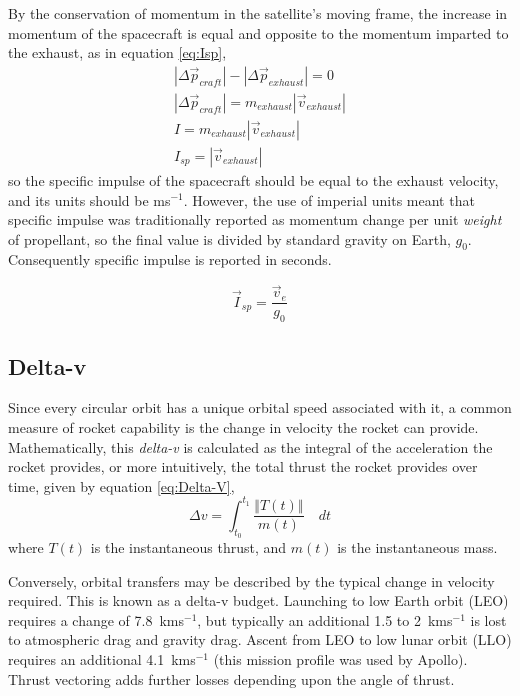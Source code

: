By the conservation of momentum in the satellite's moving frame, the increase in momentum of the spacecraft is equal and opposite to the momentum imparted to the exhaust, as in equation \eqref{eq:Isp},
\begin{subequations}\label{eq:Isp}
\begin{gather}
|\Delta\vec{p}_{craft}| - |\Delta\vec{p}_{exhaust}| = 0 \\
|\Delta\vec{p}_{craft}| = m_{exhaust}|\vec{v}_{exhaust}| \\
I = m_{exhaust}|\vec{v}_{exhaust}| \\
I_{sp} = |\vec{v}_{exhaust}|
\end{gather}
\end{subequations}
so the specific impulse of the spacecraft should be equal to the exhaust velocity, and its units should be ms$^{-1}$. However, the use of imperial units meant that specific impulse was traditionally reported as momentum change per unit {\em weight} of propellant, so the final value is divided by standard gravity on Earth, $g_0$. Consequently specific impulse is reported in seconds.

\begin{equation}
\vec{I}_{sp}=\frac{\vec{v}_e}{g_0}
\end{equation}

\subsection{Delta-v} \label{sub:Delta-v}

Since every circular orbit has a unique orbital speed associated with it, a common measure of rocket capability is the change in velocity the rocket can provide. Mathematically, this \emph{delta-v} is calculated as the integral of the acceleration the rocket provides, or more intuitively, the total thrust the rocket provides over time, given by equation \eqref{eq:Delta-V},
\begin{equation}\label{eq:Delta-V}
\Delta v=\int_{t_{0}}^{t_{1}}\frac{\left\Vert T\left(t\right)\right\Vert }{m\left(t\right)}\quad dt
\end{equation}
where $T\left(t\right)$ is the instantaneous thrust, and $m\left(t\right)$ is the instantaneous mass.

Conversely, orbital transfers may be described by the typical change in velocity required. This is known as a delta-v budget. Launching to low Earth orbit (LEO) requires a change of 7.8~kms$^{-1}$, but typically an additional 1.5 to 2~kms$^{-1}$ is lost to atmospheric drag and gravity drag. Ascent from LEO to low lunar orbit (LLO) requires an additional 4.1~kms$^{-1}$ (this mission profile was used by Apollo). Thrust vectoring adds further losses depending upon the angle of thrust. 

